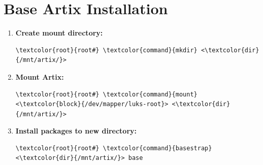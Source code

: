 \documentclass[10pt, a4paper, onecolumn, oneside, titlepage, openany]{book}
\begin{document}
\section{Base Artix Installation}
\begin{enumerate}
    \item \textbf{Create mount directory:}
\begin{Verbatim}[commandchars=\\\{\}]
\textcolor{root}{root#} \textcolor{command}{mkdir} <\textcolor{dir}{/mnt/artix/}>
\end{Verbatim}
    \item \textbf{Mount Artix:}
\begin{Verbatim}[commandchars=\\\{\}]
\textcolor{root}{root#} \textcolor{command}{mount} <\textcolor{block}{/dev/mapper/luks-root}> <\textcolor{dir}{/mnt/artix/}>
\end{Verbatim}
    \item \textbf{Install packages to new directory:}
\begin{Verbatim}[commandchars=\\\{\}]
\textcolor{root}{root#} \textcolor{command}{basestrap} <\textcolor{dir}{/mnt/artix/}> base
\end{Verbatim}
\end{enumerate}
\end{document}
